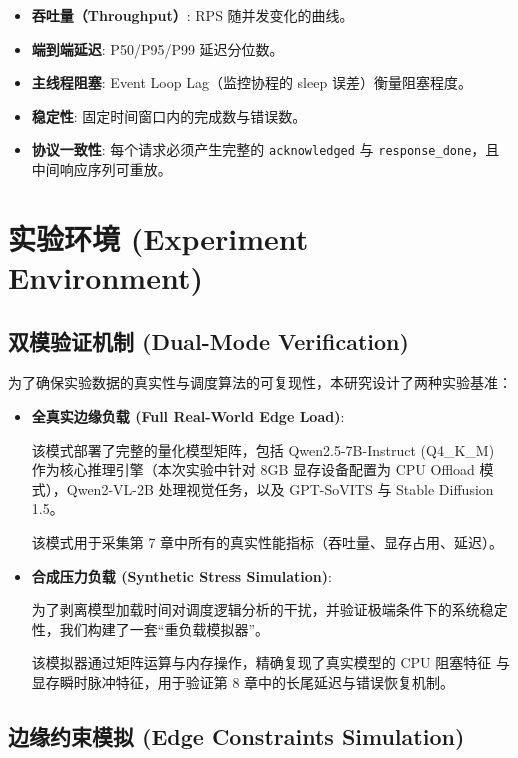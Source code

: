 \documentclass[a4paper,12pt]{article}
\begin{document}
\begin{itemize}
    \item \textbf{吞吐量（Throughput）}: RPS 随并发变化的曲线。
    \item \textbf{端到端延迟}: P50/P95/P99 延迟分位数。
    \item \textbf{主线程阻塞}: Event Loop Lag（监控协程的 sleep 误差）衡量阻塞程度。
    \item \textbf{稳定性}: 固定时间窗口内的完成数与错误数。
    \item \textbf{协议一致性}: 每个请求必须产生完整的 \texttt{acknowledged} 与 \texttt{response\_done}，且中间响应序列可重放。
\end{itemize}

\section{实验环境 (Experiment Environment)}

\subsection{双模验证机制 (Dual-Mode Verification)}

为了确保实验数据的真实性与调度算法的可复现性，本研究设计了两种实验基准：

\begin{itemize}
    \item \textbf{全真实边缘负载 (Full Real-World Edge Load)}:

    该模式部署了完整的量化模型矩阵，包括 Qwen2.5-7B-Instruct (Q4\_K\_M) 作为核心推理引擎（本次实验中针对 8GB 显存设备配置为 CPU Offload 模式），Qwen2-VL-2B 处理视觉任务，以及 GPT-SoVITS 与 Stable Diffusion 1.5。

    该模式用于采集第 7 章中所有的真实性能指标（吞吐量、显存占用、延迟）。

    \item \textbf{合成压力负载 (Synthetic Stress Simulation)}:

    为了剥离模型加载时间对调度逻辑分析的干扰，并验证极端条件下的系统稳定性，我们构建了一套“重负载模拟器”。

    该模拟器通过矩阵运算与内存操作，精确复现了真实模型的 CPU 阻塞特征 与 显存瞬时脉冲特征，用于验证第 8 章中的长尾延迟与错误恢复机制。
\end{itemize}

\subsection{边缘约束模拟 (Edge Constraints Simulation)}
\end{document}
